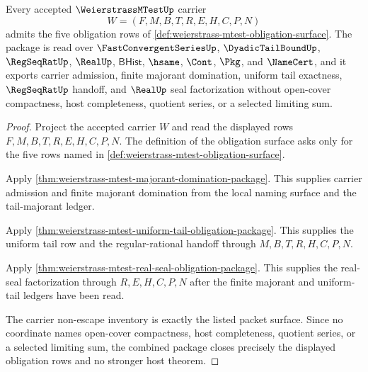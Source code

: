 \begin{theorem}
\label{thm:weierstrass-mtest-obligation-closure-package}
Every accepted $\WeierstrassMTestUp$ carrier
$$
W=(F,M,B,T,R,E,H,C,P,N)
$$
admits the five obligation rows of \autoref{def:weierstrass-mtest-obligation-surface}. The package is read over $\FastConvergentSeriesUp$, $\DyadicTailBoundUp$, $\RegSeqRatUp$, $\RealUp$, $\mathsf{BHist}$, $\hsame$, $\Cont$, $\Pkg$, and $\NameCert$, and it exports carrier admission, finite majorant domination, uniform tail exactness, $\RegSeqRatUp$ handoff, and $\RealUp$ seal factorization without open-cover compactness, host completeness, quotient series, or a selected limiting sum.
\end{theorem}
\begin{proof}
Project the accepted carrier $W$ and read the displayed rows $F,M,B,T,R,E,H,C,P,N$. The definition of the obligation surface asks only for the five rows named in \autoref{def:weierstrass-mtest-obligation-surface}.

Apply \autoref{thm:weierstrass-mtest-majorant-domination-package}. This supplies carrier admission and finite majorant domination from the local naming surface and the tail-majorant ledger.

Apply \autoref{thm:weierstrass-mtest-uniform-tail-obligation-package}. This supplies the uniform tail row and the regular-rational handoff through $M,B,T,R,H,C,P,N$.

Apply \autoref{thm:weierstrass-mtest-real-seal-obligation-package}. This supplies the real-seal factorization through $R,E,H,C,P,N$ after the finite majorant and uniform-tail ledgers have been read.

The carrier non-escape inventory is exactly the listed packet surface. Since no coordinate names open-cover compactness, host completeness, quotient series, or a selected limiting sum, the combined package closes precisely the displayed obligation rows and no stronger host theorem.
\end{proof}

